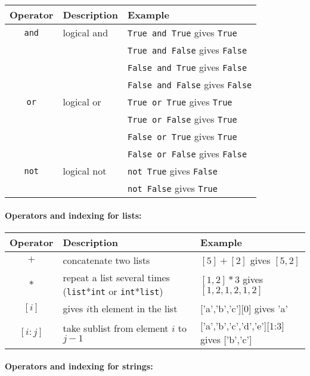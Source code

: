 \documentclass[11pt]{article}
\begin{document}
\begin{center}

\begin{tabular}{|c|l|l|}
\hline
Operator & Description & Example\\
\hline
\texttt{and} & logical and & \texttt{True and True} gives \texttt{True}\\
&  & \texttt{True and False} gives \texttt{False}\\
&  & \texttt{False and True} gives \texttt{False}\\
&  & \texttt{False and False} gives \texttt{False}\\
\hline
\texttt{or} & logical or & \texttt{True or True} gives \texttt{True}\\
&  & \texttt{True or False} gives \texttt{True}\\
&  & \texttt{False or True} gives \texttt{True}\\
&  & \texttt{False or False} gives \texttt{False}\\
\hline
\texttt{not} & logical not & \texttt{not True} gives \texttt{False}\\
&  & \texttt{not False} gives \texttt{True}\\
\hline
\end{tabular}
\end{center}

\paragraph{Operators and indexing for lists:}

\begin{center}

\begin{tabular}{|c|l|l|}
\hline
Operator & Description & Example\\
\hline
$+$ & concatenate two lists & $[5]+[2]$ gives $[5,2]$\\
\hline
$*$ & repeat a list several times (\texttt{list}*\texttt{int} or \texttt{int}*\texttt{list}) & $[1,2]*3$ gives $[1,2,1,2,1,2]$\\
\hline
$[i]$ & gives $i$th element in the list & ['a','b','c'][0] gives 'a'\\
\hline
$[i:j]$ & take sublist from element $i$ to $j-1$ &
['a','b','c','d','e'][1:3] gives ['b','c']\\
\hline
\end{tabular}
\end{center}

\paragraph{Operators and indexing for strings:}
\end{document}
